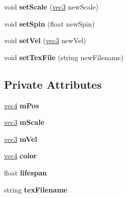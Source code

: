 \begin{DoxyCompactItemize}
\item 
\hypertarget{class_particle_a1cdeee73a5eb04f48c0002f7136852ff}{void {\bfseries set\-Scale} (\hyperlink{struct_angel_1_1vec3}{vec3} new\-Scale)}\label{class_particle_a1cdeee73a5eb04f48c0002f7136852ff}

\item 
\hypertarget{class_particle_ac0cd12e63886b12d2b99549ecb552838}{void {\bfseries set\-Spin} (float new\-Spin)}\label{class_particle_ac0cd12e63886b12d2b99549ecb552838}

\item 
\hypertarget{class_particle_ac77b501936d44053585151c83b66ba22}{void {\bfseries set\-Vel} (\hyperlink{struct_angel_1_1vec3}{vec3} new\-Vel)}\label{class_particle_ac77b501936d44053585151c83b66ba22}

\item 
\hypertarget{class_particle_a5a387ad04e530af85dcd64763282d3a0}{void {\bfseries set\-Tex\-File} (string new\-Filename)}\label{class_particle_a5a387ad04e530af85dcd64763282d3a0}

\end{DoxyCompactItemize}
\subsection*{Private Attributes}
\begin{DoxyCompactItemize}
\item 
\hypertarget{class_particle_a3d51791a544fb2cbf2e93531b3626132}{\hyperlink{struct_angel_1_1vec4}{vec4} {\bfseries m\-Pos}}\label{class_particle_a3d51791a544fb2cbf2e93531b3626132}

\item 
\hypertarget{class_particle_ad18c1ecffb2e5d032732d4cd058bb986}{\hyperlink{struct_angel_1_1vec3}{vec3} {\bfseries m\-Scale}}\label{class_particle_ad18c1ecffb2e5d032732d4cd058bb986}

\item 
\hypertarget{class_particle_a4cd8cbbc5b05126133df8246611339f2}{\hyperlink{struct_angel_1_1vec3}{vec3} {\bfseries m\-Vel}}\label{class_particle_a4cd8cbbc5b05126133df8246611339f2}

\item 
\hypertarget{class_particle_a258a4d53c38caca98676a7d41022706b}{\hyperlink{struct_angel_1_1vec4}{vec4} {\bfseries color}}\label{class_particle_a258a4d53c38caca98676a7d41022706b}

\item 
\hypertarget{class_particle_a08108b2a0a2c0ec96f235510cc9aa0a2}{float {\bfseries lifespan}}\label{class_particle_a08108b2a0a2c0ec96f235510cc9aa0a2}

\item 
\hypertarget{class_particle_a639147e87ea9fd39b04ac3bafb6ff97b}{string {\bfseries tex\-Filename}}\label{class_particle_a639147e87ea9fd39b04ac3bafb6ff97b}

\end{DoxyCompactItemize}


